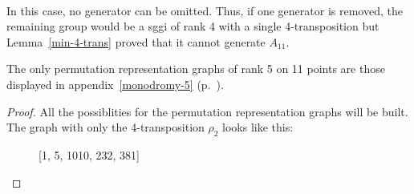 \paragraph{}
In this case, no generator can be omitted. Thus, if one generator is removed, the remaining group would be a sggi of rank 4 with a single 4-transposition but Lemma~\ref{min-4-trans} proved that it cannot generate $A_{11}$.

\begin{theorem}
  The only permutation representation graphs of rank 5 on 11 points are those displayed in appendix~\ref{monodromy-5} (p.~\pageref{monodromy-5}).
\end{theorem}

\begin{proof}
  All the possiblities for the permutation representation graphs will be built. The graph with only the 4-transposition $\rho_2$ looks like this:

  \begin{figure}[H]
    \begin{center}
      \caption{[1, 5, 1010, 232, 381]}
    \end{center}
  \end{figure}


\end{proof}
